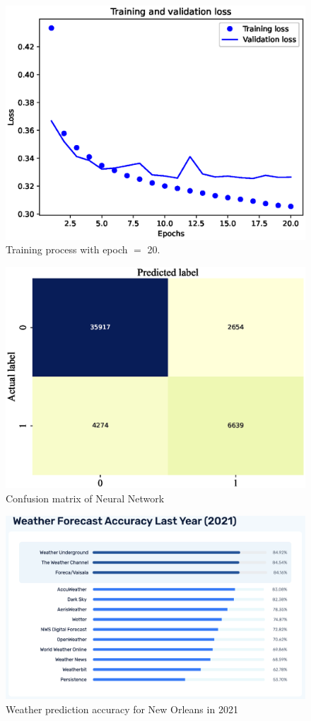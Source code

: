 \documentclass[11pt, a4paper, jou]{apa7}
\begin{document}
\begin{figure}[h]
    \centering
    \caption{Training process with epoch $=$ 20. }\label{fig:NN_process_20}
    \includegraphics[width=.45\textwidth]{figures/error_20.eps}
\end{figure}

\begin{figure}[h]
    \centering
    \caption{Confusion matrix of Neural Network}\label{fig:FC_confusion_matrix}
    \includegraphics[width=.45\textwidth]{figures/FC_confusion_matrix.eps}
\end{figure}

\begin{table}[h]
    \centering
    \caption{Neural Network summary}
    \label{tab:FC_summary}
\end{table}

\begin{figure}[h]
    \centering
    \caption{Weather prediction accuracy for New Orleans in 2021}\label{fig:weather_prediction_nola}
    \includegraphics[width=.55\textwidth]{figures/Weather2021.png}
\end{figure}
\end{document}
